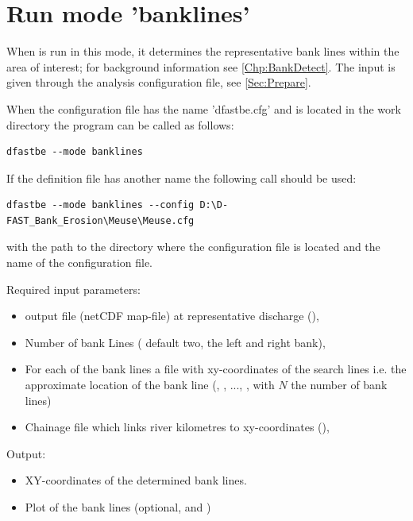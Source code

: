 \section{Run mode 'banklines'} \label{Sec:rundetect}

When \dfastbe is run in this mode, it determines the representative bank lines within the area of interest; for background information see \autoref{Chp:BankDetect}.
The input is given through the analysis configuration file, see \autoref{Sec:Prepare}.

When the configuration file has the name 'dfastbe.cfg' and is located in the work directory the program can be called as follows:

\begin{Verbatim}
dfastbe --mode banklines
\end{Verbatim}

If the definition file has another name the following call should be used:

\begin{Verbatim}
dfastbe --mode banklines --config D:\D-FAST_Bank_Erosion\Meuse\Meuse.cfg
\end{Verbatim}

with  the path to the directory where the configuration file is located and  the name of the configuration file.

Required input parameters:

\begin{itemize}
\item \dflowfm output file (netCDF map-file) at representative discharge (),
\item Number of bank Lines ( default two, the left and right bank),
\item For each of the bank lines a file with xy-coordinates of the search lines i.e. the approximate location of the bank line (, , ..., , with $N$ the number of bank lines)
\item Chainage file which links river kilometres to xy-coordinates (),
\end{itemize}

Output:

\begin{itemize}
\item XY-coordinates of the determined bank lines.
\item Plot of the bank lines (optional,  and )
\end{itemize}

